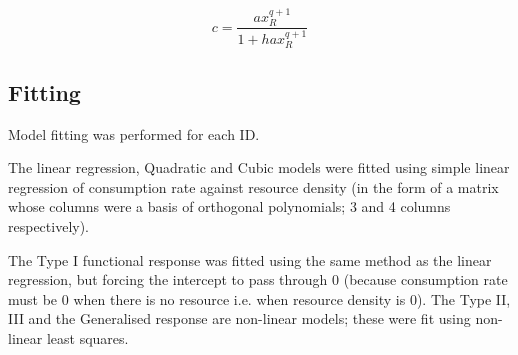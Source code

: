 \documentclass[11pt]{article}
\begin{document}
            \begin{equation}
                c = \frac{ax_{R}^{q+1}}{1 + hax_{R}^{q+1}}\label{eq:3}
            \end{equation}

        \subsection{Fitting}
            Model fitting was performed for each ID.
            
            The linear regression, Quadratic and Cubic models were fitted using simple linear regression of consumption rate against resource density (in the form of a matrix whose columns were a basis of orthogonal polynomials; 3 and 4 columns respectively).

            The Type I functional response was fitted using the same method as the linear regression, but forcing the intercept to pass through 0 (because consumption rate must be 0 when there is no resource i.e. when resource density is 0). The Type II, III and the Generalised response are non-linear models; these were fit using non-linear least squares.
            
\end{document}
